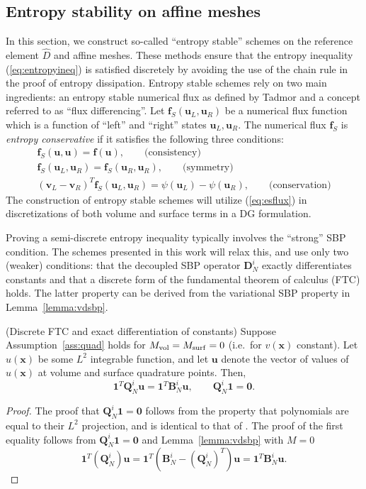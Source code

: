 \documentclass[review]{siamart0216}
\theoremstyle{assumption}
\renewcommand{\hat}[1]{\hat{#1}}
\newcommand{\LRp}[1]{\left( #1 \right)}
\renewcommand{\hat}{\widehat}
\begin{document}
\subsection{Entropy stability on affine meshes}
\label{sec:affine}

In this section, we construct so-called ``entropy stable'' schemes on the reference element $\hat{D}$ and affine meshes.  These methods ensure that the entropy inequality (\ref{eq:entropyineq}) is satisfied discretely by avoiding the use of the chain rule in the proof of entropy dissipation.  Entropy stable schemes rely on two main ingredients: an entropy stable numerical flux as defined by Tadmor \cite{tadmor1987numerical} and a concept referred to as ``flux differencing''.  Let $\bm{f}_S\LRp{\bm{u}_L,\bm{u}_R}$ be a numerical flux function which is a function of ``left'' and ``right'' states $\bm{u}_L,\bm{u}_R$.  The numerical flux $\bm{f}_S$ is \textit{entropy conservative} if it satisfies the following three conditions:  
\begin{gather}
\bm{f}_S(\bm{u},\bm{u}) = \bm{f}(\bm{u}), \qquad \text{(consistency)}\\
\bm{f}_S(\bm{u}_L,\bm{u}_R) = \bm{f}_S(\bm{u}_R,\bm{u}_R), \qquad \text{(symmetry)}\nonumber\\
\LRp{\bm{v}_L-\bm{v}_R}^T\bm{f}_S(\bm{u}_L,\bm{u}_R) = \psi(\bm{u}_L) - \psi(\bm{u}_R), \qquad \text{(conservation)}\nonumber
\label{eq:esflux}
\end{gather}
The construction of entropy stable schemes will utilize (\ref{eq:esflux}) in discretizations of both volume and surface terms in a DG formulation.  

Proving a semi-discrete entropy inequality typically involves the ``strong'' SBP condition.  The schemes presented in this work will relax this, and use only two (weaker) conditions: that the decoupled SBP operator $\bm{D}^i_N$ exactly differentiates constants and that a discrete form of the fundamental theorem of calculus (FTC) holds.  The latter property can be derived from the variational SBP property in Lemma~\ref{lemma:vdsbp}.

\begin{corollary}{(Discrete FTC and exact differentiation of constants)}
\label{lemma:sbpcor}
Suppose Assumption~\ref{ass:quad} holds for $M_{\rm vol} = M_{\rm surf} = 0$ (i.e.\ for $v(\bm{x})$ constant).  
Let $u(\bm{x})$ be some $L^2$ integrable function, and let $\bm{u}$ denote the vector of values of $u(\bm{x})$ at volume and surface quadrature points. Then, 
\[
\bm{1}^T\bm{Q}^i_N\bm{u} = \bm{1}^T\bm{B}^i_N\bm{u}, \qquad \bm{Q}^i_N\bm{1} = \bm{0}.
\]
\end{corollary}
\begin{proof}
The proof that $\bm{Q}^i_N \bm{1} = \bm{0}$ follows from the property that polynomials are equal to their $L^2$ projection, and is identical to that of \cite{chan2017discretely,chan2018discretely}.     The proof of the first equality follows from $\bm{Q}^i_N \bm{1} = \bm{0}$ and Lemma~\ref{lemma:vdsbp} with $M=0$
\[
\bm{1}^T\LRp{\bm{Q}^i_N}\bm{u} = \bm{1}^T\LRp{\bm{B}^i_N - \LRp{\bm{Q}^i_N}^T}\bm{u} = \bm{1}^T{\bm{B}^i_N}\bm{u}.
\]
\end{proof}
\end{document}
